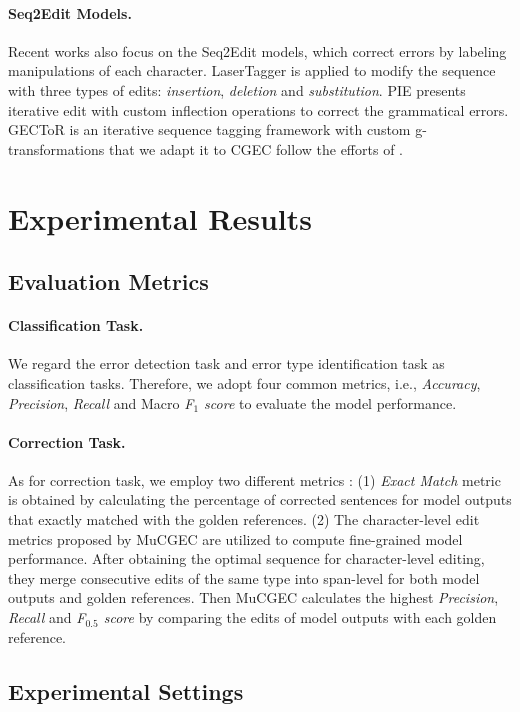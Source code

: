 \documentclass[11pt]{article}
\begin{document}
\paragraph{Seq2Edit Models.} Recent works also focus on the Seq2Edit models, which correct errors by labeling manipulations of each character. LaserTagger \cite{malmi2019encode} is applied to modify the sequence with three types of edits: \emph{insertion}, \emph{deletion} and \emph{substitution}. PIE \cite{awasthi2019parallel} presents iterative edit with custom inflection operations to correct the grammatical errors. GECToR \cite{omelianchuk2020gector} is an iterative sequence tagging framework with custom g-transformations that we adapt it to CGEC follow the efforts of \citet{zhang2022mucgec}. 
\section{Experimental Results}

\subsection{Evaluation Metrics}
\paragraph{Classification Task.} We regard the error detection task and error type identification task as classification tasks. Therefore, we adopt four common metrics, i.e., \emph{Accuracy}, \emph{Precision}, \emph{Recall} and Macro \emph{F$_1$ score} to evaluate the model performance.

\paragraph{Correction Task.} As for correction task, we employ two different metrics : (1) \emph{Exact Match} metric is obtained by calculating the percentage of corrected sentences for model outputs that exactly matched with the golden references. (2) The character-level edit metrics proposed by MuCGEC \cite{zhang2022mucgec} are utilized to compute fine-grained model performance. After obtaining the optimal sequence for character-level editing, they merge consecutive edits of the same type into span-level for both model outputs and golden references. Then MuCGEC calculates the highest \emph{Precision}, \emph{Recall} and \emph{F$_{0.5}$ score} by comparing the edits of model outputs with each golden reference.

\subsection{Experimental Settings}
\end{document}
